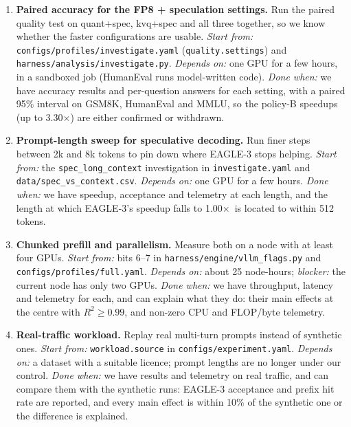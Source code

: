 \documentclass[10pt,a4paper]{article}
\newcommand{\x}{\ensuremath{\times}}
\newcommand{\fp}[1]{{\leavevmode\urlstyle{tt}\color{codecol}\nolinkurl{#1}}}
\begin{document}
\begin{enumerate}
\item \textbf{Paired accuracy for the FP8 + speculation settings.} Run the paired quality test on quant+spec, kvq+spec
and all three together, so we know whether the faster configurations are usable. \emph{Start from:}
\fp{configs/profiles/investigate.yaml} (\texttt{quality.settings}) and \fp{harness/analysis/investigate.py}.
\emph{Depends on:} one GPU for a few hours, in a sandboxed job (HumanEval runs model-written code). \emph{Done when:}
we have accuracy results and per-question answers for each setting, with a paired 95\% interval on GSM8K, HumanEval
and MMLU, so the policy-B speedups (up to 3.30\x) are either confirmed or withdrawn.
\item \textbf{Prompt-length sweep for speculative decoding.} Run finer steps between 2k and 8k tokens to pin down where
EAGLE-3 stops helping. \emph{Start from:} the \texttt{spec\_long\_context} investigation in \fp{investigate.yaml} and
\fp{data/spec_vs_context.csv}. \emph{Depends on:} one GPU for a few hours. \emph{Done when:} we have speedup,
acceptance and telemetry at each length, and the length at which EAGLE-3's speedup falls to 1.00\x\ is located to
within 512 tokens.
\item \textbf{Chunked prefill and parallelism.} Measure both on a node with at least four GPUs. \emph{Start from:} bits
6--7 in \fp{harness/engine/vllm_flags.py} and \fp{configs/profiles/full.yaml}. \emph{Depends on:} about 25 node-hours;
\emph{blocker:} the current node has only two GPUs. \emph{Done when:} we have throughput, latency and telemetry for
each, and can explain what they do: their main effects at the centre with $R^2 \ge 0.99$, and non-zero CPU and
FLOP/byte telemetry.
\item \textbf{Real-traffic workload.} Replay real multi-turn prompts instead of synthetic ones. \emph{Start from:}
\texttt{workload.source} in \fp{configs/experiment.yaml}. \emph{Depends on:} a dataset with a suitable licence;
prompt lengths are no longer under our control. \emph{Done when:} we have results and telemetry on real traffic, and
can compare them with the synthetic runs: EAGLE-3 acceptance and prefix hit rate are reported, and every main effect
is within 10\% of the synthetic one or the difference is explained.
\end{enumerate}

\end{document}
